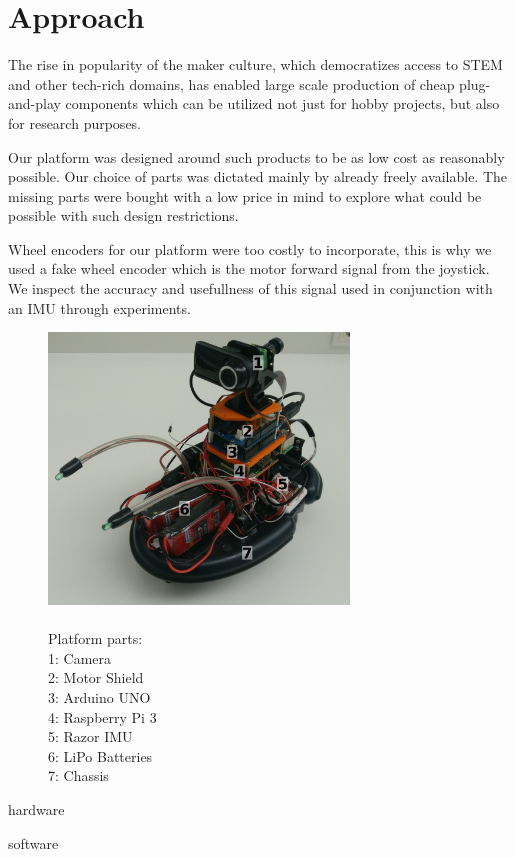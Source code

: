\documentclass[class=report, crop=false]{standalone}
\begin{document}
\chapter{Approach}\label{cha:approach}
\pagestyle{scrheadings}
The rise in popularity of the maker culture, which democratizes access to STEM and other tech-rich domains, has enabled large scale production of cheap plug-and-play components which can be utilized not just for hobby projects, but also for research purposes.

Our platform was designed around such products to be as low cost as reasonably possible. Our choice of parts was dictated mainly by already freely available. The missing parts were bought with a low price in mind to explore what could be possible with such design restrictions.

Wheel encoders for our platform were too costly to incorporate, this is why we used a fake wheel encoder which is the motor forward signal from the joystick. We inspect the accuracy and usefullness of this signal used in conjunction with an IMU through experiments.

\begin{figure}
  \centering
    \includegraphics[width=8cm]{images/profile_numbered}
    \caption{\\Platform parts:\\1: Camera\\2: Motor Shield\\3: Arduino UNO\\
    4: Raspberry Pi 3\\5: Razor IMU\\6: LiPo Batteries\\7: Chassis}
\end{figure}

{hardware}

{software}
\end{document}
